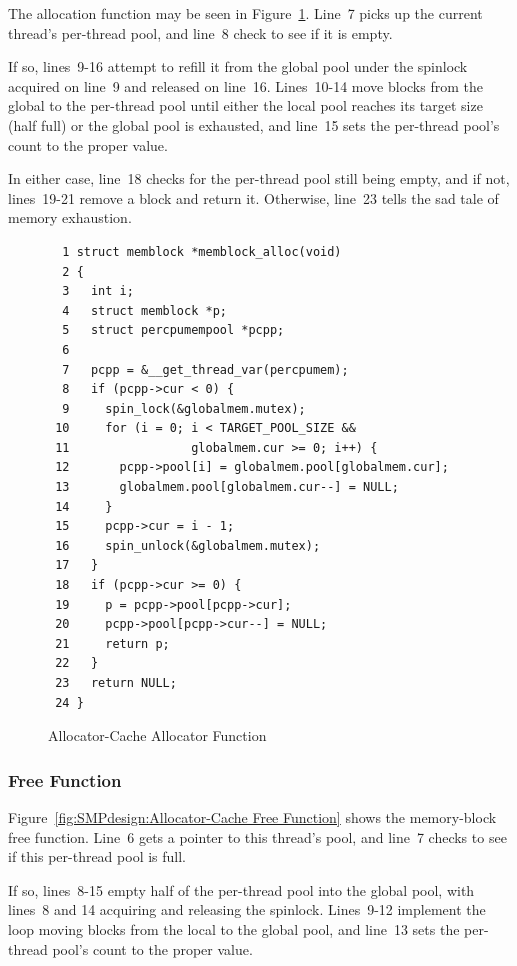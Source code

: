 The allocation function  may be seen in
Figure~\ref{fig:SMPdesign:Allocator-Cache Allocator Function}.
Line~7 picks up the current thread's per-thread pool,
and line~8 check to see if it is empty.

If so, lines~9-16 attempt to refill it from the global pool
under the spinlock acquired on line~9 and released on line~16.
Lines~10-14 move blocks from the global to the per-thread pool until
either the local pool reaches its target size (half full) or
the global pool is exhausted, and line~15 sets the per-thread pool's
count to the proper value.

In either case, line~18 checks for the per-thread pool still being
empty, and if not, lines~19-21 remove a block and return it.
Otherwise, line~23 tells the sad tale of memory exhaustion.
\fi

\begin{figure}[htbp]
{ \scriptsize
\begin{verbatim}
  1 struct memblock *memblock_alloc(void)
  2 {
  3   int i;
  4   struct memblock *p;
  5   struct percpumempool *pcpp;
  6
  7   pcpp = &__get_thread_var(percpumem);
  8   if (pcpp->cur < 0) {
  9     spin_lock(&globalmem.mutex);
 10     for (i = 0; i < TARGET_POOL_SIZE &&
 11                 globalmem.cur >= 0; i++) {
 12       pcpp->pool[i] = globalmem.pool[globalmem.cur];
 13       globalmem.pool[globalmem.cur--] = NULL;
 14     }
 15     pcpp->cur = i - 1;
 16     spin_unlock(&globalmem.mutex);
 17   }
 18   if (pcpp->cur >= 0) {
 19     p = pcpp->pool[pcpp->cur];
 20     pcpp->pool[pcpp->cur--] = NULL;
 21     return p;
 22   }
 23   return NULL;
 24 }
\end{verbatim}
}
\caption{Allocator-Cache Allocator Function}
\label{fig:SMPdesign:Allocator-Cache Allocator Function}
\end{figure}

\subsubsection{Free Function}

Figure~\ref{fig:SMPdesign:Allocator-Cache Free Function} shows
the memory-block free function.
Line~6 gets a pointer to this thread's pool, and
line~7 checks to see if this per-thread pool is full.

If so, lines~8-15 empty half of the per-thread pool into the global pool,
with lines~8 and 14 acquiring and releasing the spinlock.
Lines~9-12 implement the loop moving blocks from the local to the
global pool, and line~13 sets the per-thread pool's count to the proper
value.

